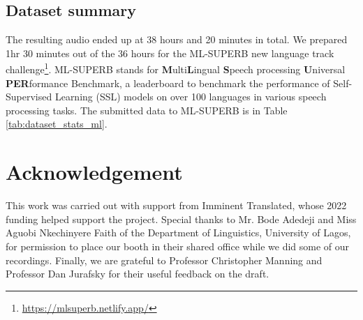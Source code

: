\documentclass{article}
\begin{document}
\subsection{Dataset summary}
The resulting audio ended up at 38 hours and 20 minutes in total. We prepared 1hr 30 minutes out of the 36 hours for the ML-SUPERB new language track challenge\footnote{\url{https://mlsuperb.netlify.app/}}. ML-SUPERB stands for \textbf{M}ulti\textbf{L}ingual \textbf{S}peech processing \textbf{U}niversal \textbf{PER}formance Benchmark, a leaderboard to benchmark the performance of Self-Supervised Learning (SSL) models on over 100 languages in various speech processing tasks. The submitted data to ML-SUPERB is in Table \ref{tab:dataset_stats_ml}.

\section{Acknowledgement}
This work was carried out with support from Imminent Translated, whose 2022 funding helped support the project. Special thanks to Mr. Bode Adedeji and Miss Aguobi Nkechinyere Faith of the Department of Linguistics, University of Lagos, for permission to place our booth in their shared office while we did some of our recordings. Finally, we are grateful to Professor Christopher Manning and Professor Dan Jurafsky for their useful feedback on the draft. %



\end{document}
